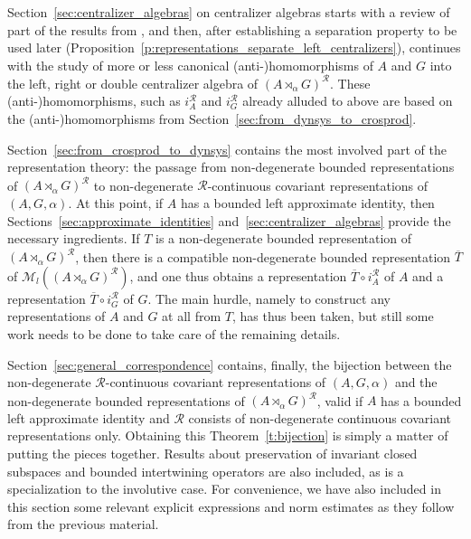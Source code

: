 \documentclass{amsart}
\theoremstyle{plain}
\theoremstyle{definition}
\numberwithin{equation}{section}
\begin{document}
Section~\ref{sec:centralizer_algebras} on centralizer algebras starts with a review of part of the results from \cite{extendart}, and then, after establishing a separation property to be used later (Proposition~\ref{p:representations_separate_left_centralizers}), continues with the study of more or less canonical (anti-)homomorphisms of $A$ and $G$ into the left, right or double centralizer algebra of ${(A {\rtimes}_\alpha G)^\mathcal{R}}$. These (anti-)homomorphisms, such as $i_A^{\mathcal R}$ and $i_G^{\mathcal R}$ already alluded to above are based on the (anti-)homomorphisms from Section~\ref{sec:from_dynsys_to_crosprod}.

Section~\ref{sec:from_crosprod_to_dynsys} contains the most involved part of the representation theory: the passage from non-degenerate bounded representations of ${(A {\rtimes}_\alpha G)^\mathcal{R}}$ to non-degenerate ${\mathcal R}$-continuous covariant representations of ${(A,G,\alpha)}$. At this point, if $A$ has a bounded left approximate identity, then Sections~\ref{sec:approximate_identities} and~\ref{sec:centralizer_algebras} provide the necessary ingredients. If $T$ is a non-degenerate bounded representation of ${(A {\rtimes}_\alpha G)^\mathcal{R}}$, then there is a compatible non-degenerate bounded representation $\overline{T}$ of $\mathcal{M}_l({(A {\rtimes}_\alpha G)^\mathcal{R}})$, and one thus obtains a representation $\overline{T} \circ i_A^{\mathcal R}$ of $A$ and a representation $\overline{T} \circ i_G^{\mathcal R}$ of $G$. The main hurdle, namely to construct any representations of $A$ and $G$ at all from $T$, has thus been taken, but still some work needs to be done to take care of the remaining details.

Section~\ref{sec:general_correspondence} contains, finally, the bijection between the non-degenerate ${\mathcal R}$-continuous covariant representations of ${(A,G,\alpha)}$ and the non-degenerate bounded representations of ${(A {\rtimes}_\alpha G)^\mathcal{R}}$, valid if $A$ has a bounded left approximate identity and ${\mathcal R}$ consists of non-degenerate continuous covariant representations only. Obtaining this Theorem~\ref{t:bijection} is simply a matter of putting the pieces together. Results about preservation of invariant closed subspaces and bounded intertwining operators are also included, as is a specialization to the involutive case. For convenience, we have also included in this section some relevant explicit expressions and norm estimates as they follow from the previous material.
\end{document}
